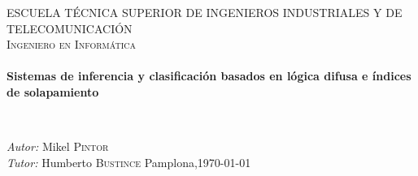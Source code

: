 \begin{titlepage}
\begin{center}
\textsc{\LARGE ESCUELA TÉCNICA SUPERIOR DE INGENIEROS INDUSTRIALES Y DE TELECOMUNICACIÓN}\\[1.5cm]

\textsc{\Large Ingeniero en Informática}\\[0.5cm]

\HRule \\[0.4cm]
{ \huge \bfseries Sistemas de inferencia y clasificación basados en lógica difusa e índices de solapamiento\\[0.4cm] }

\HRule \\[1.5cm]

\vfill
\hfill
\begin{minipage}{0.4\textwidth}
\begin{flushright} \large
\emph{Autor:} Mikel \textsc{Pintor}\\
\emph{Tutor:} Humberto \textsc{Bustince}
{\large Pamplona,\today}
\end{flushright}
\end{minipage}
\vfill

\end{center}
\end{titlepage}